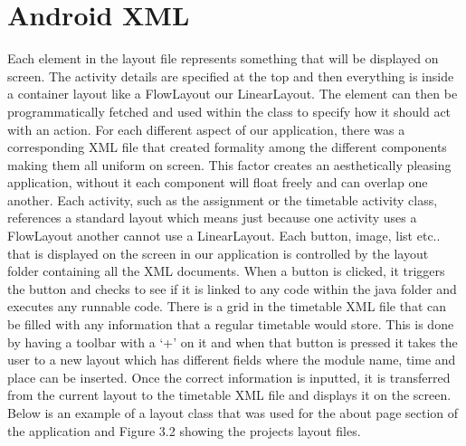 \section{Android XML}
Each element in the layout file represents something that will be displayed on screen. The activity details are specified at the top and then everything is inside a container layout like a FlowLayout our LinearLayout. The element can then be programmatically fetched and used within the class to specify how it should act with an action. For each different aspect of our application, there was a corresponding XML file that created formality among the different components making them all uniform on screen. This factor creates an aesthetically pleasing application, without it each component will float freely and can overlap one another. Each activity, such as the assignment or the timetable activity class, references a standard layout which means just because one activity uses a FlowLayout another cannot use a LinearLayout. Each button, image, list etc.. that is displayed on the screen in our application is controlled by the layout folder containing all the XML documents. When a button is clicked, it triggers the button and checks to see if it is linked to any code within the java folder and executes any runnable code. There is a grid in the timetable XML file that can be filled with any information that a regular timetable would store. This is done by having a toolbar with a ‘+’ on it and when that button is pressed it takes the user to a new layout which has different fields where the module name, time and place can be inserted. Once the correct information is inputted, it is transferred from the current layout to the timetable XML file and displays it on the screen. Below is an example of a layout class that was used for the about page section of the application and Figure 3.2 showing the projects layout files.
 \pagebreak
